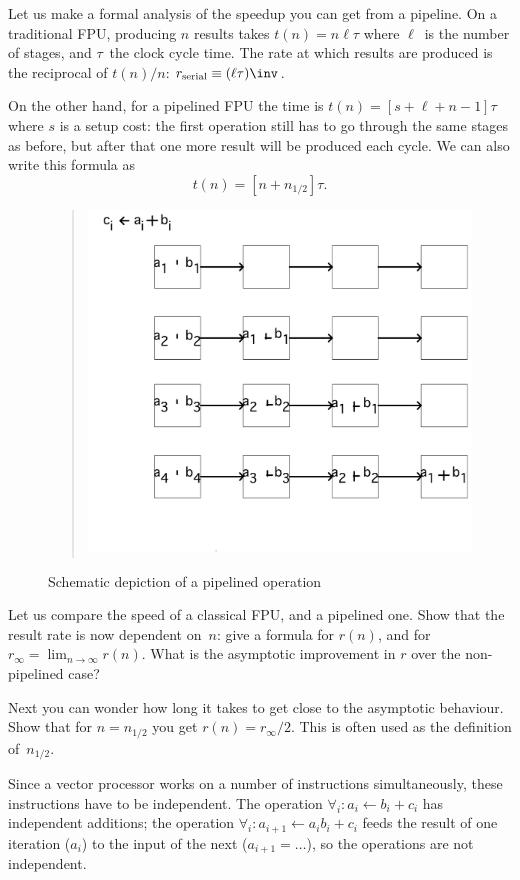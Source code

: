 Let us make a formal analysis of the speedup you can get from a
pipeline. On a traditional \ac{FPU}, producing $n$ results
takes $t(n)=n\ell\tau$ where $\ell$~is the number of stages, and
$\tau$~the clock cycle time. The rate at which results are produced is
the reciprocal of $t(n)/n$: $r_{\mathrm{serial}}\equiv(\ell\tau)\inv$.

On the other hand, for a pipelined \ac{FPU} the time is
$t(n)=[s+\ell+n-1]\tau$ where $s$ is a setup cost:
the first operation still has to go through the same stages
as before, but after that one more result will be
produced each cycle. We can also write this formula as
\[ t(n)=[n+n_{1/2}]\tau. \]


\begin{figure}[ht]
  \begin{quote}
  \includegraphics[scale=.12]{graphics/pipeline}
  \end{quote}
  \caption{Schematic depiction of a pipelined operation}
  \label{fig:pipeline}
\end{figure}
\begin{exercise}
  Let us compare the speed of a classical \ac{FPU}, and a pipelined
  one. Show that the result rate is now dependent on~$n$: give a
  formula for $r(n)$, and for
  $r_\infty=\lim_{n\rightarrow\infty}r(n)$. What is the asymptotic
  improvement in $r$ over the non-pipelined case?

  Next you can wonder how long it takes to get close to the asymptotic
  behaviour. Show that for $n=n_{1/2}$ you get $r(n)=r_\infty/2$.
  This is often used as the definition of~$n_{1/2}$.
\end{exercise}
Since a vector processor works on a number of instructions
simultaneously, these instructions have to be independent. The
operation $\forall_i\colon a_i\leftarrow b_i+c_i$ has independent
additions; the operation $\forall_i\colon a_{i+1}\leftarrow
a_ib_i+c_i$ feeds the result of one iteration ($a_i$) to the input of
the next ($a_{i+1}=\ldots$), so
the operations are not independent. 

